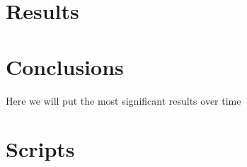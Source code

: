 \documentclass[11pt,letterpaper]{report}
\begin{document}
	
	\chapter{Results}
	
	
	
	
	
	\chapter{Conclusions}
	Here we will put the most significant results over time
	
	
	
	
	\appendix
	
	\chapter[Scripts]{Scripts}
	
\end{document}
